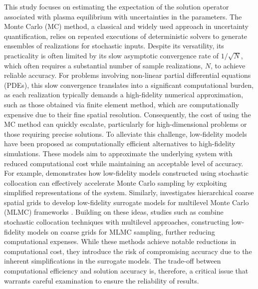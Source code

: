 This study focuses on estimating the expectation of the solution operator associated with plasma equilibrium with uncertainties in the parameters. The Monte Carlo (MC) method, a classical and widely used approach in uncertainty quantification, relies on repeated executions of deterministic solvers to generate ensembles of realizations for stochastic inputs. Despite its versatility, its practicality is often limited by its slow asymptotic convergence rate of $1/\sqrt{N}$, which often requires a substantial number of sample realizations, $N$, to achieve reliable accuracy. For problems involving non-linear partial differential equations (PDEs), this slow convergence translates into a significant computational burden, as each realization typically demands a high-fidelity numerical approximation, such as those obtained via finite element method, which are computationally expensive due to their fine spatial resolution. Consequently, the cost of using the MC method can quickly escalate, particularly for high-dimensional problems or those requiring precise solutions. To alleviate this challenge, low-fidelity models have been proposed as computationally efficient alternatives to high-fidelity simulations.  These models aim to approximate the underlying system with reduced computational cost while maintaining an acceptable level of accuracy. For example, \cite{ElLiSa:2022} demonstrates how low-fidelity models constructed using stochastic collocation can effectively accelerate Monte Carlo sampling by exploiting simplified representations of the system. Similarly,
\cite{ElLiSa:2023} investigates hierarchical coarse spatial grids to develop low-fidelity surrogate models for multilevel Monte Carlo (MLMC) frameworks \cite{BaScZo:2011,Gi:2008}. Building on these ideas, studies such as \cite{Li:2024} combine stochastic collocation techniques with multilevel approaches, constructing low-fidelity models on coarse grids for MLMC sampling, further reducing computational expenses. While these methods achieve notable reductions in computational cost, they introduce the risk of compromising accuracy due to the inherent simplifications in the surrogate models. The trade-off between computational efficiency and solution accuracy is, therefore, a critical issue that warrants careful examination to ensure the reliability of results.


